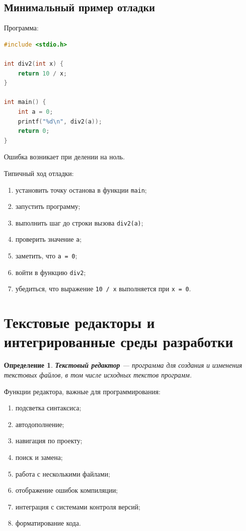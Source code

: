 \documentclass[12pt,a4paper]{article}
\newtheorem{definition}{Определение}
\begin{document}
\subsection{Минимальный пример отладки}

Программа:

\begin{lstlisting}[language=C]
#include <stdio.h>

int div2(int x) {
    return 10 / x;
}

int main() {
    int a = 0;
    printf("%d\n", div2(a));
    return 0;
}
\end{lstlisting}

Ошибка возникает при делении на ноль.

Типичный ход отладки:
\begin{enumerate}
  \item установить точку останова в функции \texttt{main};
  \item запустить программу;
  \item выполнить шаг до строки вызова \texttt{div2(a)};
  \item проверить значение \texttt{a};
  \item заметить, что \texttt{a = 0};
  \item войти в функцию \texttt{div2};
  \item убедиться, что выражение \texttt{10 / x} выполняется при \texttt{x = 0}.
\end{enumerate}

\section{Текстовые редакторы и интегрированные среды разработки}

\begin{definition}
\textbf{Текстовый редактор} --- программа для создания и изменения текстовых файлов, в том числе исходных текстов программ.
\end{definition}

Функции редактора, важные для программирования:
\begin{enumerate}
  \item подсветка синтаксиса;
  \item автодополнение;
  \item навигация по проекту;
  \item поиск и замена;
  \item работа с несколькими файлами;
  \item отображение ошибок компиляции;
  \item интеграция с системами контроля версий;
  \item форматирование кода.
\end{enumerate}
\end{document}
